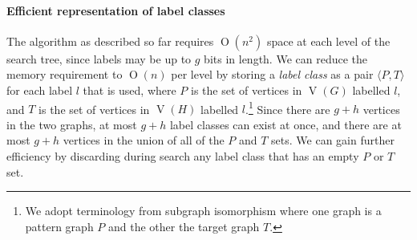 \documentclass[letterpaper]{article}
\DeclareMathOperator{\V}{V}
\newcommand{\BigO}[1]{\ensuremath{\operatorname{O}\left(#1\right)}}
\begin{document}
\paragraph{Efficient representation of label classes} The algorithm as
described so far requires $\BigO{n^2}$ space at each level of the search tree,
since labels may be up to $g$ bits in length. We can reduce the memory
requirement to $\BigO{n}$ per level by storing a \emph{label class} as a pair
$\langle P,T \rangle$ for each label $l$ that is used, where $P$ is the set of
vertices in $\V(G)$ labelled $l$, and $T$ is the set of vertices in $\V(H)$
labelled $l$.\footnote{We adopt terminology from subgraph isomorphism where one
graph is a pattern graph $P$ and the other the target graph $T$.} Since there
are $g + h$ vertices in the two graphs, at most $g + h$ label classes
can exist at once, and there are at most $g + h$ vertices in the union of
all of the $P$ and $T$ sets.  We can gain further efficiency by discarding
during search any label class that has an empty $P$ or $T$ set.
\end{document}
